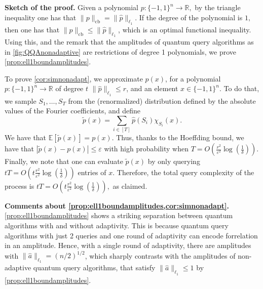 \documentclass[11pt]{article}
\DeclareMathOperator{\cb}{cb}
\newcommand{\norm}[1]{\|#1\|}
\newcommand{\R}{\mathbb{R}} %
\newcommand{\1}{\mathbf{1}}
\newcommand{\eps}{\varepsilon}
\theoremstyle{plain}
\theoremstyle{definition}
\theoremstyle{remark}
\begin{document}
\vspace{0.3cm}
\noindent\textbf{Sketch of the proof.} Given a polynomial $p:\{-1,1\}^n\to \R,$ by the triangle inequality one has that $\norm{p}_{\cb}= \norm{\widehat p}_{\ell_1}$. If the degree of the polynomial is $1,$ then one has that $\norm{p}_{\cb}\leq \norm{\widehat p}_{\ell_1}$, which is an optimal functional inequality. Using this, and the remark that the amplitudes of quantum query algorithms as in \cref{fig:QQAnonadaptive} are restrictions of degree 1 polynomials, we prove \cref{prop:ell1boundamplitudes}. 

To prove \cref{cor:simnonadapt}, we approximate $p(x)$, for a polynomial $p:\{-1,1\}^n\to \R$ of degree $t$  $\norm{\widehat p}_{\ell_1}\leq r$, and an element $x\in\{-1,1\}^n$. To do that, we sample $S_1,\dots,S_T$ from the (renormalized) distribution defined by the absolute values of the Fourier coefficients, and define 
\begin{equation*}
    \widetilde p(x)=\sum_{i\in [T]}\widehat p(S_i)\chi_{S_i}(x).
\end{equation*}
We have that $\mathbb E[\widetilde p(x)]=p(x)$. Thus, thanks to the Hoeffding bound, we have that $|\widetilde p(x)-p(x)|\leq \eps$ with high probability when $T=O(\frac{r^2}{\eps^2}\log(\frac{1}{\delta}))$. Finally, we note that one can evaluate $\widetilde p(x)$ by only querying $tT=O(t\frac{r^2}{\eps^2}\log(\frac{1}{\delta}))$ entries of $x.$ Therefore, the total query complexity of the process is $tT=O(t\frac{r^2}{\eps^2}\log(\frac{1}{\delta})),$ as claimed. 

\vspace{0.3cm}
\noindent\textbf{Comments about \cref{prop:ell1boundamplitudes,cor:simnonadapt}.} \cref{prop:ell1boundamplitudes} shows a striking separation between quantum algorithms with and without adaptivity. This is because quantum query algorithms with just 2 queries and one round of adaptivity can encode forrelation in an amplitude. Hence, with a single round of adaptivity, there are amplitudes with $\norm{\widehat a}_{\ell_1}=(n/2)^{1/2}$, which sharply contrasts with the amplitudes of non-adaptive quantum query algorithms, that satisfy $\norm{\widehat a}_{\ell_1}\leq 1$ by \cref{prop:ell1boundamplitudes}.
\end{document}
